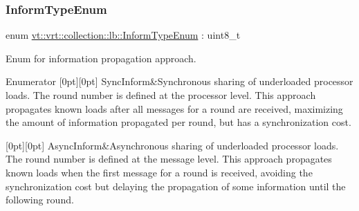 \subsubsection{\texorpdfstring{Inform\+Type\+Enum}{InformTypeEnum}}
{\footnotesize\ttfamily enum \hyperlink{namespacevt_1_1vrt_1_1collection_1_1lb_a38645ae954fc9b85e4c8f020eb0234aa}{vt\+::vrt\+::collection\+::lb\+::\+Inform\+Type\+Enum} \+: uint8\+\_\+t\hspace{0.3cm}{\ttfamily [strong]}}



Enum for information propagation approach. 

\begin{DoxyEnumFields}{Enumerator}
[0pt][0pt]{}\mbox{\label{namespacevt_1_1vrt_1_1collection_1_1lb_a38645ae954fc9b85e4c8f020eb0234aaa7228d42ce6e32b9d69a58878e39ecfa5}} 
Sync\+Inform&Synchronous sharing of underloaded processor loads. The round number is defined at the processor level. This approach propagates known loads after all messages for a round are received, maximizing the amount of information propagated per round, but has a synchronization cost. \\
\hline

[0pt][0pt]{}\mbox{\label{namespacevt_1_1vrt_1_1collection_1_1lb_a38645ae954fc9b85e4c8f020eb0234aaa1997a66729a2620d0bccf74d06bc402a}} 
Async\+Inform&Asynchronous sharing of underloaded processor loads. The round number is defined at the message level. This approach propagates known loads when the first message for a round is received, avoiding the synchronization cost but delaying the propagation of some information until the following round. \\
\hline

\end{DoxyEnumFields}
\mbox{\label{namespacevt_1_1vrt_1_1collection_1_1lb_a72b44c7e6b2052509331d57b9c94c84a}} 
